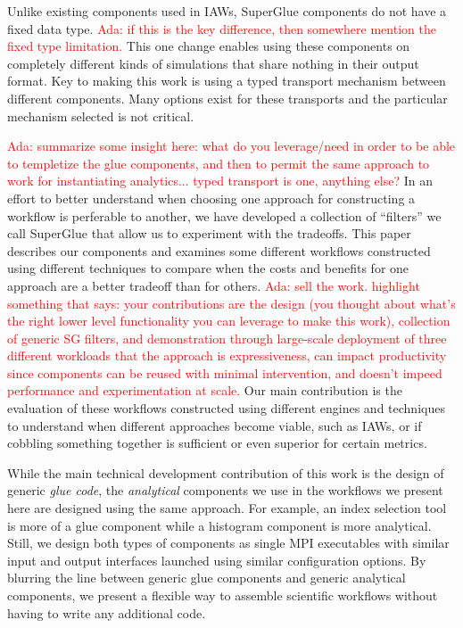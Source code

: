 \documentclass[conference]{IEEEtran}
\newcommand{\ada}[1]{\textcolor{red}{Ada: #1}}
\begin{document}
Unlike existing components used in IAWs, SuperGlue
components do not have a fixed data type. \ada{if this is the key
  difference, then somewhere mention the fixed type limitation. }
 This one change enables using these
components on completely different kinds of simulations that share nothing in
their output format. Key to making this work is using a typed transport
mechanism between different components. Many options exist for these transports
and the particular mechanism selected is not critical. 

\ada{summarize some insight here: what do you leverage/need in order
  to be able to templetize the glue components, and then to permit the
same approach to work for instantiating analytics... typed transport
is one, anything else?}
In an effort to better understand when choosing one approach for constructing a
workflow is perferable to another, we have developed a collection of ``filters''
we call SuperGlue that allow us to experiment with the tradeoffs. This paper
describes our components and examines some different workflows constructed using
different techniques to compare when the costs and benefits for one approach are
a better tradeoff than for others. 
\ada{sell the work. highlight something that says: your contributions are the design (you thought
  about what's the right lower level functionality you can leverage to
  make this work), collection of generic SG filters, and demonstration
through large-scale deployment of three different workloads that the
approach is 
expressiveness, can impact productivity since components can be reused
with minimal intervention, and doesn't impeed performance and
experimentation at scale. }
Our main contribution is the evaluation of
these workflows constructed using different engines and techniques to understand
when different approaches become viable, such as IAWs, or if cobbling something
together is sufficient or even superior for certain metrics.

While the main technical development contribution of this work is the design of
generic {\em glue code}, the {\em analytical} components we use in the
workflows we present here are designed using the same approach. For example, an
index selection tool is more of a glue component while a histogram component is
more analytical.  Still, we design both types of components as single MPI
executables with similar input and output interfaces launched using similar
configuration options.  By blurring the line between generic glue components
and generic analytical components, we present a flexible way to assemble
scientific workflows without having to write any additional code. 
\fi
\end{document}
